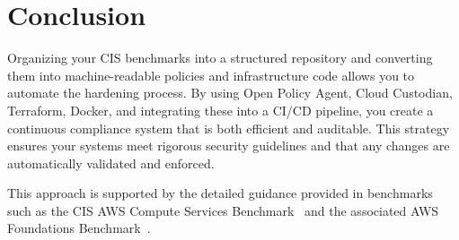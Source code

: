 \documentclass[12pt]{article}
\begin{document}
\section{Conclusion}
Organizing your CIS benchmarks into a structured repository and converting them into machine-readable policies and infrastructure code allows you to automate the hardening process. By using Open Policy Agent, Cloud Custodian, Terraform, Docker, and integrating these into a CI/CD pipeline, you create a continuous compliance system that is both efficient and auditable. This strategy ensures your systems meet rigorous security guidelines and that any changes are automatically validated and enforced.

\bigskip

This approach is supported by the detailed guidance provided in benchmarks such as the CIS AWS Compute Services Benchmark~\cite{turn2file0} and the associated AWS Foundations Benchmark~\cite{turn2file2}.



\end{document}
